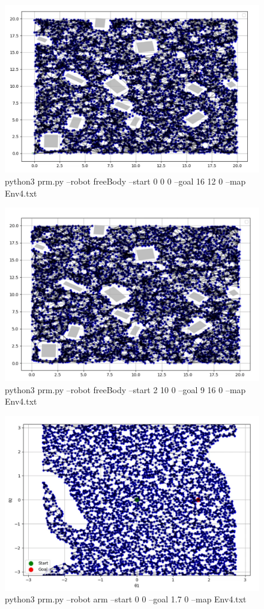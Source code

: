 \documentclass{article}
\begin{document}
\begin{figure} [H]
    \centering
    \includegraphics[width=0.7\linewidth]{latex_media/prm_freebody_env4_conf1.png}
    \caption{python3 prm.py --robot freeBody --start 0 0 0 --goal 16 12 0 --map Env4.txt}
\end{figure}

\begin{figure} [H]
    \centering
    \includegraphics[width=0.7\linewidth]{latex_media/prm_freebody_env4_conf2.png}
    \caption{python3 prm.py --robot freeBody --start 2 10 0 --goal 9 16 0 --map Env4.txt}
\end{figure}

\begin{figure} [H]
    \centering
    \includegraphics[width=0.7\linewidth]{latex_media/prm_arm_env4_conf1.png}
    \caption{python3 prm.py --robot arm --start 0 0 --goal 1.7 0 --map Env4.txt
}
\end{figure}
\end{document}
